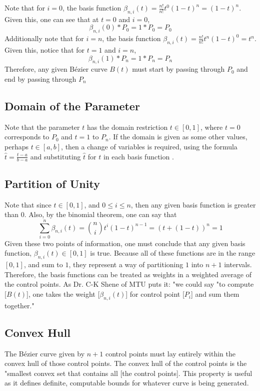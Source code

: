 \documentclass{article}
\begin{document}
Note that for $i=0$, the basis function $\beta_{n,i}(t)=\frac{n!}{n!}t^0(1-t)^n=(1-t)^n$. Given this, one can see that at $t=0$ and $i=0$, $$\beta_{n,i}(0)*P_0 = 1*P_0 = P_0$$
Additionally note that for $i=n$, the basis function $\beta_{n,i}(t)=\frac{n!}{n!}t^n(1-t)^0=t^n$. Given this, notice that for $t=1$ and $i=n$, $$\beta_{n,i}(1)*P_n=1*P_n=P_n$$
Therefore, any given Bézier curve $B(t)$ must start by passing through $P_0$ and end by passing through $P_n$

\subsection{Domain of the Parameter}
Note that the parameter $t$ has the domain restriction $t\in[0,1]$, where $t=0$ corresponds to $P_0$ and $t=1$ to $P_n$. If the domain is given as some other values, perhaps $t\in[a,b]$, then a change of variables is required, using the formula $\hat{t}=\frac{t-a}{b-a}$ and substituting $\hat{t}$ for $t$ in each basis function \cite{shene11}.

\subsection{Partition of Unity}
Note that since $t\in[0,1]$, and $0 \leq i \leq n$, then any given basis function is greater than $0$. Also, by the binomial theorem, one can say that $$\sum_{i=0}^n\beta_{n,i}(t)=\binom{n}{i}t^i(1-t)^{n-1}=(t+(1-t))^n=1$$ \cite{wyss-gallifent21}
Given these two points of information, one must conclude that any given basis function, $\beta_{n,i}(t)\in[0,1]$ is true. Because all of these functions are in the range $[0,1]$, and sum to $1$, they represent a way of partitioning $1$ into $n+1$ intervals. Therefore, the basis functions can be treated as weights in a weighted average of the control points\cite{shene11}. As Dr. C-K Shene of MTU puts it: "we could say "to compute [$B(t)$], one takes the weight [$\beta_{n,i}(t)$] for control point [$P_i$] and sum them together."

\subsection{Convex Hull}
The Bézier curve given by $n+1$ control points must lay entirely within the convex hull of those control points.\cite{shene11}\cite{wyss-gallifent21} The convex hull of the control points is the "smallest convex set that contains all [the control points].\cite{shene11} This property is useful as it defines definite, computable bounds for whatever curve is being generated. \cite{shene11}
\end{document}
